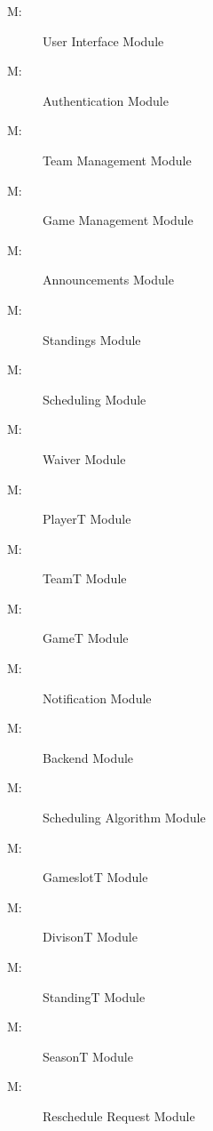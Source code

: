 \documentclass[12pt, titlepage]{article}
\newcounter{mnum}
\newcommand{\mthemnum}{M\themnum}
\begin{document}
\begin{description}
  \item [ \mthemnum \label{mUI}:] User Interface Module
  \item [ \mthemnum \label{mAuth}:] Authentication Module
  \item [ \mthemnum \label{mTeamManagement}:] Team Management Module
  \item [ \mthemnum \label{mGameManagement}:] Game Management Module
  \item [ \mthemnum \label{mAnnouncements}:] Announcements Module
  \item [ \mthemnum \label{mStandings}:] Standings Module
  \item [ \mthemnum \label{mScheduling}:] Scheduling Module
  \item [ \mthemnum \label{mWaiver}:] Waiver Module
  \item [ \mthemnum \label{mPlayerT}:] PlayerT Module
  \item [ \mthemnum \label{mTeamT}:] TeamT Module
  \item [ \mthemnum \label{mGameT}:] GameT Module
  \item [ \mthemnum \label{mNotification}:] Notification Module
  \item [ \mthemnum \label{mBackend}:] Backend Module
  \item [ \mthemnum \label{mAlgo}:] Scheduling Algorithm Module
  \item [ \mthemnum \label{mGameslotT}:] GameslotT Module
  \item [ \mthemnum \label{mDivisionT}:] DivisonT Module
  \item [ \mthemnum \label{mStandingT}:] StandingT Module
  \item [ \mthemnum \label{mSeasonT}:] SeasonT Module
  \item [ \mthemnum \label{mRR}:] Reschedule Request Module


\end{description}
\end{document}
